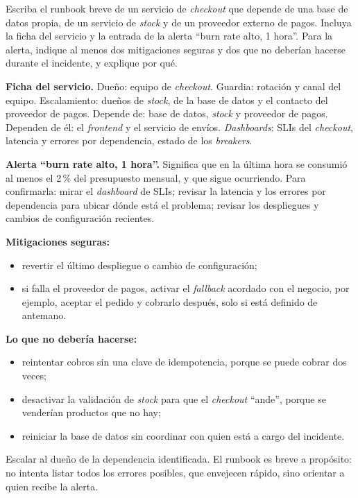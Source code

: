 \documentclass[variant=guia,cover=institutional,mode=screen]{ua-engineering-v6-article}
\begin{document}
\begin{uaexercise}
Escriba el runbook breve de un servicio de \emph{checkout} que depende de una base de datos propia, de un servicio de \emph{stock} y de un proveedor externo de pagos. Incluya la ficha del servicio y la entrada de la alerta ``burn rate alto, 1 hora''. Para la alerta, indique al menos dos mitigaciones seguras y dos que no deberían hacerse durante el incidente, y explique por qué.
\end{uaexercise}
\begin{uaanswer}
\textbf{Ficha del servicio.} Dueño: equipo de \emph{checkout}. Guardia: rotación y canal del equipo. Escalamiento: dueños de \emph{stock}, de la base de datos y el contacto del proveedor de pagos. Depende de: base de datos, \emph{stock} y proveedor de pagos. Dependen de él: el \emph{frontend} y el servicio de envíos. \emph{Dashboards}: SLIs del \emph{checkout}, latencia y errores por dependencia, estado de los \emph{breakers}.

\textbf{Alerta ``burn rate alto, 1 hora''.} Significa que en la última hora se consumió al menos el 2\,\% del presupuesto mensual, y que sigue ocurriendo. Para confirmarla: mirar el \emph{dashboard} de SLIs; revisar la latencia y los errores por dependencia para ubicar dónde está el problema; revisar los despliegues y cambios de configuración recientes.

\textbf{Mitigaciones seguras:}
\begin{itemize}
\item revertir el último despliegue o cambio de configuración;
\item si falla el proveedor de pagos, activar el \emph{fallback} acordado con el negocio, por ejemplo, aceptar el pedido y cobrarlo después, solo si está definido de antemano.
\end{itemize}

\textbf{Lo que no debería hacerse:}
\begin{itemize}
\item reintentar cobros sin una clave de idempotencia, porque se puede cobrar dos veces;
\item desactivar la validación de \emph{stock} para que el \emph{checkout} ``ande'', porque se venderían productos que no hay;
\item reiniciar la base de datos sin coordinar con quien está a cargo del incidente.
\end{itemize}

Escalar al dueño de la dependencia identificada. El runbook es breve a propósito: no intenta listar todos los errores posibles, que envejecen rápido, sino orientar a quien recibe la alerta.
\end{uaanswer}
\end{document}
